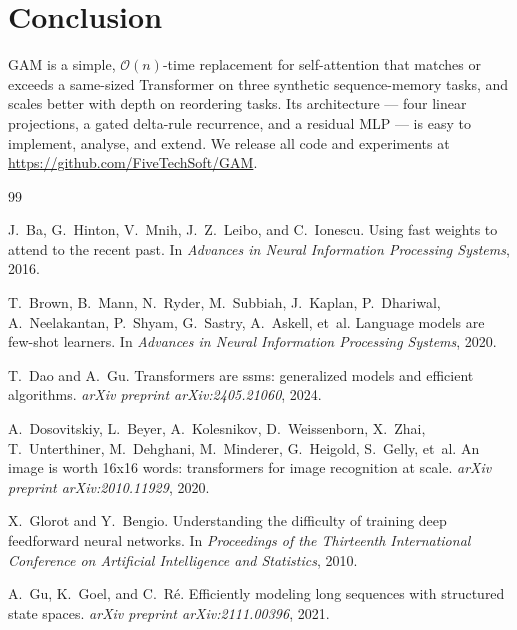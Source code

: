 \documentclass[11pt,a4paper]{article}
\begin{document}
\section{Conclusion}
\label{sec:conclusion}

GAM is a simple, $\mathcal{O}(n)$-time replacement for self-attention
that matches or exceeds a same-sized Transformer on three synthetic
sequence-memory tasks, and scales better with depth on reordering tasks.
Its architecture --- four linear projections, a gated delta-rule
recurrence, and a residual MLP --- is easy to implement, analyse,
and extend.  We release all code and experiments at
\url{https://github.com/FiveTechSoft/GAM}.


\begin{thebibliography}{99}

J.~Ba, G.~Hinton, V.~Mnih, J.~Z.~Leibo, and C.~Ionescu.
\newblock Using fast weights to attend to the recent past.
\newblock In \emph{Advances in Neural Information Processing Systems}, 2016.

T.~Brown, B.~Mann, N.~Ryder, M.~Subbiah, J.~Kaplan, P.~Dhariwal,
  A.~Neelakantan, P.~Shyam, G.~Sastry, A.~Askell, et~al.
\newblock Language models are few-shot learners.
\newblock In \emph{Advances in Neural Information Processing Systems}, 2020.

T.~Dao and A.~Gu.
\newblock Transformers are ssms: generalized models and efficient algorithms.
\newblock \emph{arXiv preprint arXiv:2405.21060}, 2024.

A.~Dosovitskiy, L.~Beyer, A.~Kolesnikov, D.~Weissenborn, X.~Zhai,
  T.~Unterthiner, M.~Dehghani, M.~Minderer, G.~Heigold, S.~Gelly,
  et~al.
\newblock An image is worth 16x16 words: transformers for image recognition
  at scale.
\newblock \emph{arXiv preprint arXiv:2010.11929}, 2020.

X.~Glorot and Y.~Bengio.
\newblock Understanding the difficulty of training deep feedforward neural
  networks.
\newblock In \emph{Proceedings of the Thirteenth International Conference
  on Artificial Intelligence and Statistics}, 2010.

A.~Gu, K.~Goel, and C.~R{\'e}.
\newblock Efficiently modeling long sequences with structured state spaces.
\newblock \emph{arXiv preprint arXiv:2111.00396}, 2021.


\end{thebibliography}
\end{document}
